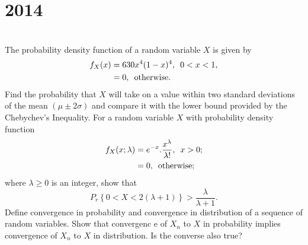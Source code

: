 \section*{2014}
\vspace{-.5cm}
\hrulefill \smallskip\\
 The probability density function of a random variable $X$ is given by \[ \begin{aligned} f_X(x) &= 630x^4(1 -x)^4 , \enskip 0 < x < 1, \\
&= 0 , \enskip \text{otherwise.}
\end{aligned} \] Find the probability that $X$ will take on a value within two standard deviations of the mean $(\mu \pm 2\sigma)$ and compare it with the lower bound provided by the Chebychev's Inequality.
\myline
{} For a random variable $X$ with probability density function \[ \begin{aligned} f_X(x;\lambda) &= e^{-x}.\dfrac{x^{\lambda}}{\lambda!}, \enskip x > 0; \\
&= 0, \enskip \text{otherwise;}
\end{aligned}\] where $\lambda \geq 0$ is an integer, show that \[ P_r \left\{0 < X < 2(\lambda + 1) \right\} > \dfrac{\lambda}{\lambda + 1}.\]
\myline
{} Define convergence in probability and convergence in distribution of a sequence of random variables. Show that convergenc e of $X_n$ to $X$ in probability implies convergence of $X_n$ to $X$ in distribution. Is the converse also true?